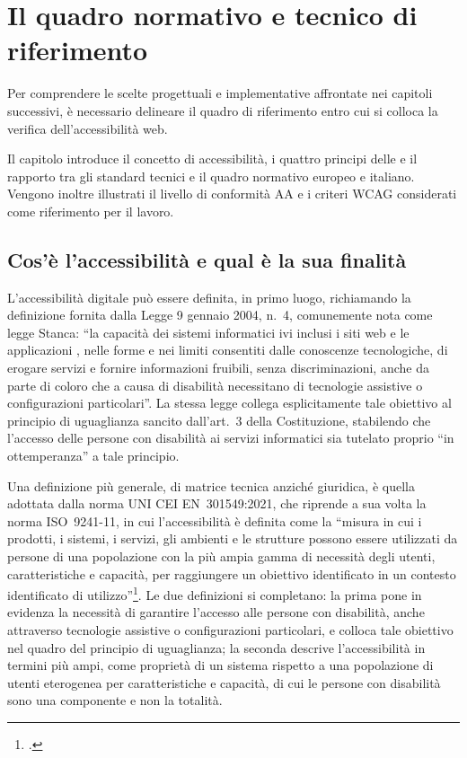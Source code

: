 \chapter{Il quadro normativo e tecnico di riferimento}
\label{chap:quadro-normativo}

Per comprendere le scelte progettuali e implementative affrontate nei capitoli successivi, è necessario delineare il quadro di riferimento entro cui si colloca la verifica dell'accessibilità web.

Il capitolo introduce il concetto di accessibilità, i quattro principi delle  e il rapporto tra gli standard tecnici e il quadro normativo europeo e italiano. Vengono inoltre illustrati il livello di conformità AA e i criteri WCAG considerati come riferimento per il lavoro.

\section{Cos'è l'accessibilità e qual è la sua finalità}
\label{sec:cose-accessibilita}

L'accessibilità digitale può essere definita, in primo luogo, richiamando la definizione fornita dalla Legge 9 gennaio 2004, n.~4, comunemente nota come legge Stanca: \enquote{la capacità dei sistemi informatici ivi inclusi i siti web e le applicazioni , nelle forme e nei limiti consentiti dalle conoscenze tecnologiche, di erogare servizi e fornire informazioni fruibili, senza discriminazioni, anche da parte di coloro che a causa di disabilità necessitano di tecnologie assistive o configurazioni particolari}. La stessa legge collega esplicitamente tale obiettivo al principio di uguaglianza sancito dall'art.~3 della Costituzione, stabilendo che l'accesso delle persone con disabilità ai servizi informatici sia tutelato proprio \enquote{in ottemperanza} a tale principio.

Una definizione più generale, di matrice tecnica anziché giuridica, è quella adottata dalla norma UNI CEI EN~301549:2021, che riprende a sua volta la norma ISO~9241-11, in cui l'accessibilità è definita come la \enquote{misura in cui i prodotti, i sistemi, i servizi, gli ambienti e le strutture possono essere utilizzati da persone di una popolazione con la più ampia gamma di necessità degli utenti, caratteristiche e capacità, per raggiungere un obiettivo identificato in un contesto identificato di utilizzo}\footcite[cap.~3, voce \enquote{accessibilità}, da ISO~9241-11:2018]{norma:en301549}. Le due definizioni si completano: la prima pone in evidenza la necessità di garantire l'accesso alle persone con disabilità, anche attraverso tecnologie assistive o configurazioni particolari, e colloca tale obiettivo nel quadro del principio di uguaglianza; la seconda descrive l'accessibilità in termini più ampi, come proprietà di un sistema rispetto a una popolazione di utenti eterogenea per caratteristiche e capacità, di cui le persone con disabilità sono una componente e non la totalità.

